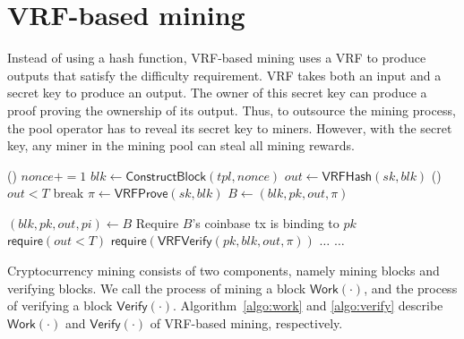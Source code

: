 \section{VRF-based mining}
\label{sec:construction}

Instead of using a hash function, VRF-based mining uses a VRF to produce outputs that satisfy the difficulty requirement.
VRF takes both an input and a secret key to produce an output.
The owner of this secret key can produce a proof proving the ownership of its output.
Thus, to outsource the mining process, the pool operator has to reveal its secret key to miners.
However, with the secret key, any miner in the mining pool can steal all mining rewards.

\begin{algorithm}[]
\caption{$\mathsf{Work}(sk, pk, tpl, T)$.}\label{algo:work}
\SetAlgoLined\DontPrintSemicolon
{}
  \While () {$nonce += 1$}{
    $blk \gets \mathsf{ConstructBlock}(tpl, nonce)$ 
    $out \gets \mathsf{VRFHash}(sk, blk)$ 
    \If () {$out < T$}{
      break 
    }
  }
  $\pi \gets \mathsf{VRFProve}(sk, blk)$ 
  $B \gets (blk, pk, out, \pi)$ 
\end{algorithm}



\begin{algorithm}[h]
\caption{$\mathsf{Verify}(B, T)$}\label{algo:verify}
\SetAlgoLined\DontPrintSemicolon
$(blk, pk, out, pi) \gets B$ 
Require $B$'s coinbase tx is binding to $pk$\\
$\mathsf{require}(out < T)$ 
$\mathsf{require}(\mathsf{VRFVerify}(pk, blk, out, \pi))$ \;
$\dots$ 
$\dots$ 
\end{algorithm}

Cryptocurrency mining consists of two components, namely mining blocks and verifying blocks.
We call the process of mining a block $\mathsf{Work}(\cdot)$, and the process of verifying a block $\mathsf{Verify}(\cdot)$.
Algorithm~\ref{algo:work} and \ref{algo:verify} describe $\mathsf{Work}(\cdot)$ and $\mathsf{Verify}(\cdot)$ of VRF-based mining, respectively.

